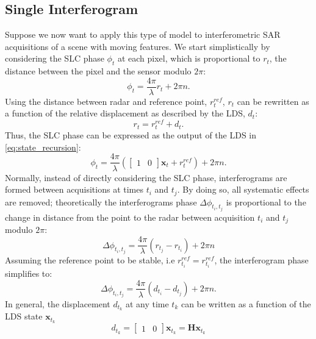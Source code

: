 \documentclass{article}
\begin{document}
\subsection{Single Interferogram}
Suppose we now want to apply this type of model to interferometric SAR acquisitions of a scene with moving features. We start simplistically by considering the SLC phase $\phi_t$ at each pixel, which is proportional to $r_t$, the distance between the pixel and the sensor modulo $2 \pi$:
\begin{equation}
	\phi_t = \frac{4\pi}{\lambda} r_t + 2 \pi n.
\end{equation}
Using the distance between radar and reference point, $r_t^{ref}$, $r_t$ can be rewritten as a function of the relative displacement as described by the LDS, $d_t$:
\begin{equation}
	r_t = r_t^{ref} + d_t.
\end{equation}
Thus, the SLC phase can be expressed as the output of the LDS in \autoref{eq:state_recursion}:
\begin{equation}
	\phi_t = \frac{4\pi}{\lambda} \left(
		\begin{bmatrix}
			1 & 0
		\end{bmatrix} \mathbf{x}_{t}
		+  r_t^{ref}
		\right) + 2 \pi n.
\end{equation}
Normally, instead of directly considering the SLC phase, interferograms are formed between acquisitions at times $t_i$ and $t_j$. By doing so, all systematic effects are removed; theoretically the interferograms phase $\Delta\phi_{t_i,t_j}$ is proportional to the change in distance from the point to the radar between acquisition $t_i$ and $t_j$ modulo $2\pi$:
\begin{equation}
	\Delta\phi_{t_i,t_j} =  \frac{4\pi}{\lambda} \left(r_{t_j} - r_{t_i}\right) + 2 \pi n
\end{equation}
Assuming the reference point to be stable, i.e $r_{t_i}^{ref} = r_{t_i}^{ref}$, the interferogram phase simplifies to:
\begin{equation}
	\Delta\phi_{t_i,t_j} =  \frac{4\pi}{\lambda} \left(d_{t_i} - d_{t_j}\right) + 2 \pi n.
\end{equation}
In general, the displacement $d_{t_k}$ at any time $t_k$ can be written as a function of the LDS state $\mathbf{x}_{t_k}$
\begin{equation}
	d_{t_k} = \begin{bmatrix}
		1 & 0
	\end{bmatrix} \mathbf{x}_{t_k} = \mathbf{H}  \mathbf{x}_{t_k}
\end{equation}
\end{document}

